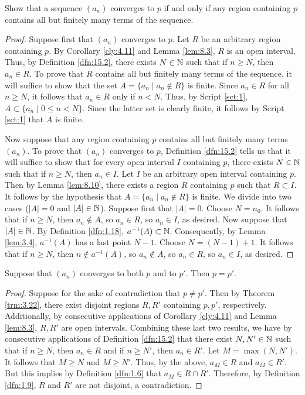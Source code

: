 \documentclass[../main.tex]{subfiles}
\begin{document}
\begin{exercise}\label{exr:15.3}
    Show that a sequence $(a_n)$ converges to $p$ if and only if any region containing $p$ contains all but finitely many terms of the sequence.
    \begin{proof}
        Suppose first that $(a_n)$ converges to $p$. Let $R$ be an arbitrary region containing $p$. By Corollary \ref{cly:4.11} and Lemma \ref{lem:8.3}, $R$ is an open interval. Thus, by Definition \ref{dfn:15.2}, there exists $N\in\mathbb{N}$ such that if $n\geq N$, then $a_n\in R$. To prove that $R$ contains all but finitely many terms of the sequence, it will suffice to show that the set $A=\{a_n\mid a_n\notin R\}$ is finite. Since $a_n\in R$ for all $n\geq N$, it follows that $a_n\in R$ only if $n<N$. Thus, by Script \ref{sct:1}, $A\subset\{a_n\mid 0\leq n<N\}$. Since the latter set is clearly finite, it follows by Script \ref{sct:1} that $A$ is finite.\par
        Now suppose that any region containing $p$ contains all but finitely many terms $(a_n)$. To prove that $(a_n)$ converges to $p$, Definition \ref{dfn:15.2} tells us that it will suffice to show that for every open interval $I$ containing $p$, there exists $N\in\mathbb{N}$ such that if $n\geq N$, then $a_n\in I$. Let $I$ be an arbitrary open interval containing $p$. Then by Lemma \ref{lem:8.10}, there exists a region $R$ containing $p$ such that $R\subset I$. It follows by the hypothesis that $A=\{a_n\mid a_n\notin R\}$ is finite. We divide into two cases ($|A|=0$ and $|A|\in\mathbb{N}$). Suppose first that $|A|=0$. Choose $N=n_0$. It follows that if $n\geq N$, then $a_n\notin A$, so $a_n\in R$, so $a_n\in I$, as desired. Now suppose that $|A|\in\mathbb{N}$. By Definition \ref{dfn:1.18}, $a^{-1}(A)\subset\mathbb{N}$. Consequently, by Lemma \ref{lem:3.4}, $a^{-1}(A)$ has a last point $N-1$. Choose $N=(N-1)+1$. It follows that if $n\geq N$, then $n\notin a^{-1}(A)$, so $a_n\notin A$, so $a_n\in R$, so $a_n\in I$, as desired.
    \end{proof}
\end{exercise}

\begin{theorem}\label{trm:15.4}
    Suppose that $(a_n)$ converges to both $p$ and to $p'$. Then $p=p'$.
    \begin{proof}
        Suppose for the sake of contradiction that $p\neq p'$. Then by Theorem \ref{trm:3.22}, there exist disjoint regions $R,R'$ containing $p,p'$, respectively. Additionally, by consecutive applications of Corollary \ref{cly:4.11} and Lemma \ref{lem:8.3}, $R,R'$ are open intervals. Combining these last two results, we have by consecutive applications of Definition \ref{dfn:15.2} that there exist $N,N'\in\mathbb{N}$ such that if $n\geq N$, then $a_n\in R$ and if $n\geq N'$, then $a_n\in R'$. Let $M=\max(N,N')$. It follows that $M\geq N$ and $M\geq N'$. Thus, by the above, $a_M\in R$ and $a_M\in R'$. But this implies by Definition \ref{dfn:1.6} that $a_M\in R\cap R'$. Therefore, by Definition \ref{dfn:1.9}, $R$ and $R'$ are not disjoint, a contradiction.
    \end{proof}
\end{theorem}
\end{document}
